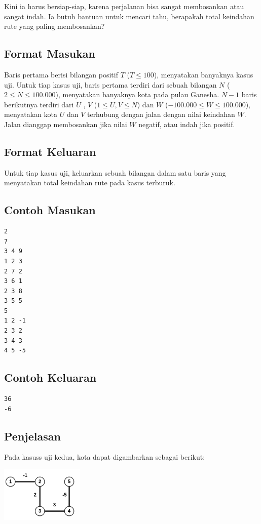 \documentclass{article}
\begin{document}
Kini ia harus bersiap-siap, karena perjalanan bisa sangat membosankan atau sangat indah.
Ia butuh bantuan untuk mencari tahu, berapakah total keindahan rute yang paling membosankan?

\subsection*{Format Masukan}
Baris pertama berisi bilangan positif $T$ ($T \leq 100$), menyatakan banyaknya kasus uji.
Untuk tiap kasus uji, baris pertama terdiri dari sebuah bilangan $N$ ($2 \leq N \leq 100.000$), menyatakan banyaknya kota pada pulau Ganesha.
$N-1$ baris berikutnya terdiri dari $U$ , $V$ ($1 \leq U, V \leq N$) dan $W$ ($-100.000 \leq W \leq 100.000$), menyatakan kota $U$ dan $V$ terhubung dengan jalan dengan nilai keindahan $W$.
Jalan dianggap membosankan jika nilai $W$ negatif, atau indah jika positif.

\subsection*{Format Keluaran}
Untuk tiap kasus uji, keluarkan sebuah bilangan dalam satu baris yang menyatakan total keindahan rute pada kasus terburuk.

\pagebreak

\begin{multicols}{2}
\subsection*{Contoh Masukan}
\begin{lstlisting}
2
7
3 4 9
1 2 3
2 7 2
3 6 1
2 3 8
3 5 5
5
1 2 -1
2 3 2
3 4 3
4 5 -5
\end{lstlisting}
\columnbreak
\subsection*{Contoh Keluaran}
\begin{lstlisting}
36
-6
\end{lstlisting}
\vfill
\null
\end{multicols}

\subsection*{Penjelasan}
Pada kasuss uji kedua, kota dapat digambarkan sebagai berikut:

\includegraphics[width=150px]{sample-2}
\end{document}
